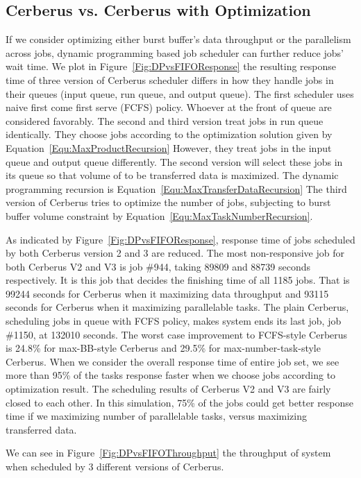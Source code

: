 \subsection{Cerberus vs. Cerberus with Optimization}
If we consider optimizing either burst buffer's data throughput or the parallelism across jobs,
dynamic programming based job scheduler can further reduce jobs' wait time.
We plot in Figure~\ref{Fig:DPvsFIFOResponse} the resulting response time of
three version of Cerberus scheduler differs in
how they handle jobs in their queues (input queue, run queue, and output queue).
The first scheduler uses naive first come first serve (FCFS) policy.
Whoever at the front of queue are considered favorably.
The second and third version treat jobs in run queue identically.
They choose jobs according to the optimization solution given by Equation~\ref{Equ:MaxProductRecursion}
However, they treat jobs in the input queue and output queue differently.
The second version will select these jobs in its queue so that
volume of to be transferred data is maximized.
The dynamic programming recursion is Equation~\ref{Equ:MaxTransferDataRecursion}
The third version of Cerberus tries to optimize the number of jobs,
subjecting to burst buffer volume constraint by Equation~\ref{Equ:MaxTaskNumberRecursion}.

As indicated by Figure~\ref{Fig:DPvsFIFOResponse}, response time of
jobs scheduled by both Cerberus version 2 and 3 are reduced.
The most non-responsive job for both Cerberus V2 and V3 is job \#944,
taking 89809 and 88739 seconds respectively.
It is this job that decides the finishing time of all 1185 jobs.
That is 99244 seconds for Cerberus when it maximizing data throughput
and 93115 seconds for Cerberus when it maximizing parallelable tasks.
The plain Cerberus, scheduling jobs in queue with FCFS policy,
makes system ends its last job, job \#1150, at 132010 seconds.
The worst case improvement to FCFS-style Cerberus is 24.8\% for max-BB-style Cerberus
and 29.5\% for max-number-task-style Cerberus.
When we consider the overall response time of entire job set,
we see more than 95\% of the tasks response faster when we choose jobs according to
optimization result.
The scheduling results of Cerberus V2 and V3 are fairly closed to each other.
In this simulation, 75\% of the jobs could get better response time
if we maximizing number of parallelable tasks,
versus maximizing transferred data.

We can see in Figure~\ref{Fig:DPvsFIFOThroughput} the throughput of system when scheduled by 3 different versions of Cerberus.





